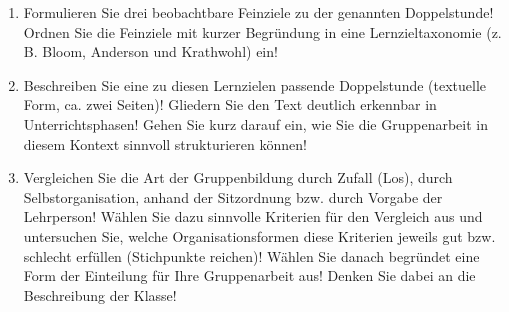 \documentclass{lehramt-informatik-aufgabe}
\begin{document}
\begin{enumerate}


\item Formulieren Sie drei beobachtbare Feinziele zu der genannten
Doppelstunde! Ordnen Sie die Feinziele mit kurzer Begründung in eine
Lernzieltaxonomie (z. B. Bloom, Anderson und Krathwohl) ein!


\item Beschreiben Sie eine zu diesen Lernzielen passende Doppelstunde
(textuelle Form, ca. zwei Seiten)! Gliedern Sie den Text deutlich
erkennbar in Unterrichtsphasen! Gehen Sie kurz darauf ein, wie Sie die
Gruppenarbeit in diesem Kontext sinnvoll strukturieren können!


\item Vergleichen Sie die Art der Gruppenbildung durch Zufall (Los),
durch Selbstorganisation, anhand der Sitzordnung bzw. durch Vorgabe der
Lehrperson! Wählen Sie dazu sinnvolle Kriterien für den Vergleich aus
und untersuchen Sie, welche Organisationsformen diese Kriterien jeweils
gut bzw. schlecht erfüllen (Stichpunkte reichen)! Wählen Sie danach
begründet eine Form der Einteilung für Ihre Gruppenarbeit aus! Denken
Sie dabei an die Beschreibung der Klasse!
\end{enumerate}
\end{document}
